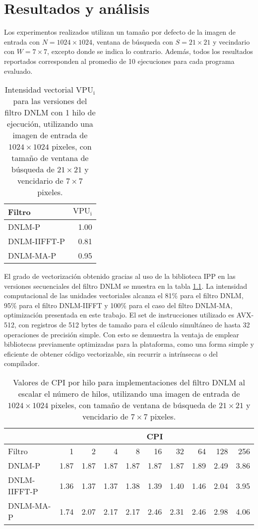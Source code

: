 \chapter{Resultados y análisis}
\label{ch:res}

Los experimentos realizados utilizan un tama\~no por defecto de la imagen de entrada con $N = 1024 \times 1024$, ventana de búsqueda con $S = 21 \times 21$ y vecindario con $W = 7 \times 7$, excepto donde se indica lo contrario. Adem\'as, todos los resultados reportados corresponden al promedio de 10 ejecuciones para cada programa evaluado.  


\begin{table}
\centering
\caption[Intensidad vectorial de operaciones con un hilo de ejecución]{Intensidad vectorial  $\text{VPU}_{\text{i}}$ para las versiones del filtro DNLM con 1 hilo de ejecución, utilizando una imagen de entrada de $1024 \times 1024$ pixeles, con tama\~no de ventana de búsqueda de $21 \times 21$ y vencidario de $7 \times 7$ pixeles. \label{tabla:vpui}}
\begin{tabular}{lr}
 Filtro & $\text{VPU}_{\text{i}}$ \tabularnewline
\hline
DNLM-P & 1.00 \tabularnewline
DNLM-IIFFT-P & 0.81 \tabularnewline
DNLM-MA-P & 0.95 \tabularnewline
\end{tabular}
\end{table}



El grado de vectorizaci\'on obtenido gracias al uso de la biblioteca IPP en las versiones secuenciales del filtro DNLM se muestra en la tabla \ref{tabla:vpui}. La intensidad computacional de las unidades vectoriales alcanza el 81\% para el filtro DNLM, 95\% para el filtro DNLM-IIFFT y 100\% para el caso del filtro DNLM-MA, optimizaci\'on presentada en este trabajo. El set de instrucciones utilizado es AVX-512, con registros de 512 bytes de tama\~no para el c\'alculo simult\'aneo de hasta 32 operaciones de precisi\'on simple. Con esto se demuestra la ventaja de emplear bibliotecas previamente optimizadas para la plataforma, como una forma simple y eficiente de obtener c\'odigo vectorizable, sin recurrir a intr\'insecas o  del compilador.


\begin{table}
\centering
\caption[Cambio en CPI al escalar el n\'umero de hilos]{Valores de CPI por hilo para implementaciones del filtro DNLM al escalar el n\'umero de hilos, utilizando una imagen de entrada de $1024 \times 1024$ pixeles, con tama\~no de ventana de búsqueda de $21 \times 21$ y vencidario de $7 \times 7$ pixeles. \label{tabla:cpi}}
\begin{tabular}{lrrrrrrrrr}
& \multicolumn{9}{c}{CPI} \tabularnewline
\hline
 Filtro & 1 & 2 & 4 & 8 & 16 & 32 & 64 & 128 & 256 \tabularnewline
\hline
DNLM-P & 1.87 & 1.87 & 1.87 & 1.87 & 1.87 & 1.87 & 1.89 & 2.49 & 3.86 \tabularnewline
DNLM-IIFFT-P & 1.36 & 1.37 & 1.37 & 1.38 & 1.39 & 1.40 & 1.46 & 2.04 & 3.95 \tabularnewline
DNLM-MA-P & 1.74 & 2.07 & 2.17 & 2.17 & 2.46 & 2.31 & 2.46 & 2.98 & 4.06 \tabularnewline
\end{tabular}
\end{table}


